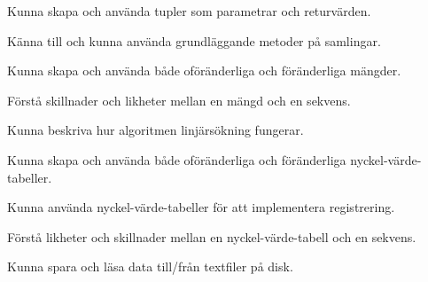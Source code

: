 









\item Kunna skapa och använda tupler som parametrar och returvärden.
\item Känna till och kunna använda grundläggande metoder på samlingar.
\item Kunna skapa och använda både oföränderliga och föränderliga mängder.
\item Förstå skillnader och likheter mellan en mängd och en sekvens.
\item Kunna beskriva hur algoritmen linjärsökning fungerar.
\item Kunna skapa och använda både oföränderliga och föränderliga nyckel-värde-tabeller.
\item Kunna använda nyckel-värde-tabeller för att implementera registrering.
\item Förstå likheter och skillnader mellan en nyckel-värde-tabell och en sekvens.
\item Kunna spara och läsa data till/från textfiler på disk.
 